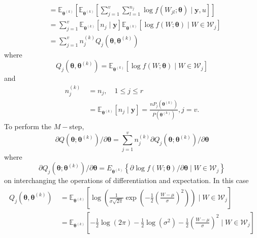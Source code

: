 \begin{exam}
\begin{align*}
         & = \mathbb{E}_{\bm{\theta}^{(k)}} \left[ \mathbb{E}_{\bm{\theta}^{(k)}} \left[ \sum_{j=1}^{v} \sum_{l=1}^{n_j} \log f \left( W_{jl} ; \bm{\theta} \right) \mid \bm{y} , u \right]\right]        \\
         & = \sum_{j=1}^{v} \mathbb{E}_{\bm{\theta}^{(k)}} \left[ n_j \mid \bm{y} \right] \mathbb{E}_{\bm{\theta}^{(k)}} \left[  \log f \left( W ; \bm{\theta} \right) \mid W \in \mathcal{W}_{j} \right] \\
         & = \sum_{j=1}^{v} n_{j}^{(k)} Q_j (\bm{\theta} , \bm{\theta}^{(k)})
    \end{align*}
    where
    \[
        Q_j (\bm{\theta} , \bm{\theta}^{(k)}) = \mathbb{E}_{\bm{\theta}^{(k)}} \left[ \log f (W;\bm{\theta}) \mid W \in \mathcal{W}_{j} \right]
    \]
    and
    \begin{align*}
        n_{j}^{(k)} \
         & = n_j, \quad 1 \leq j \leq r                                                                                                     \\
         & = \mathbb{E}_{\bm{\theta}^{(k)}} \left[ n_j \mid \bm{y} \right] = \frac{n P_{j}(\bm{\theta}^{(k)})}{P(\bm{\theta}^{(k)})}, j=v .
    \end{align*}
    To perform the $M-$step,
    \begin{equation*}
        \partial Q\left(\boldsymbol{\theta} ; \boldsymbol{\theta}^{(k)}\right) / \partial \boldsymbol{\theta}=\sum_{j=1}^{v} n_{j}^{(k)} \partial Q_{j}\left(\boldsymbol{\theta} ; \boldsymbol{\theta}^{(k)}\right) / \partial \boldsymbol{\theta}
    \end{equation*}
    where
    \begin{equation*}
        \partial Q_{j}\left(\boldsymbol{\theta} ; \boldsymbol{\theta}^{(k)}\right) / \partial \boldsymbol{\theta}=E_{\boldsymbol{\theta}^{(k)}}\left\{\partial \log f(W ; \boldsymbol{\theta}) / \partial \boldsymbol{\theta} \mid W \in \mathcal{W}_{j}\right\}
    \end{equation*}
    on interchanging the operations of differentiation and expectation. In this case
    \begin{align*}
        Q_j (\bm{\theta} , \bm{\theta}^{(k)}) \
         & = \mathbb{E}_{\bm{\theta}^{(k)}} \left[ \log \left( \frac{1}{\sigma \sqrt{2 \pi}} \exp \left( -\frac{1}{2} \left( \frac{W - \mu}{\sigma} \right)^2 \right) \right) \mid W \in \mathcal{W}_{j} \right]              \\
         & = \mathbb{E}_{\bm{\theta}^{(k)}} \left[ - \frac{1}{2} \log \left( 2 \pi \right) - \frac{1}{2} \log \left( \sigma^2 \right) -\frac{1}{2} \left( \frac{W - \mu}{\sigma} \right)^2 \mid W \in \mathcal{W}_{j} \right] \\

\end{align*}
\end{exam}
